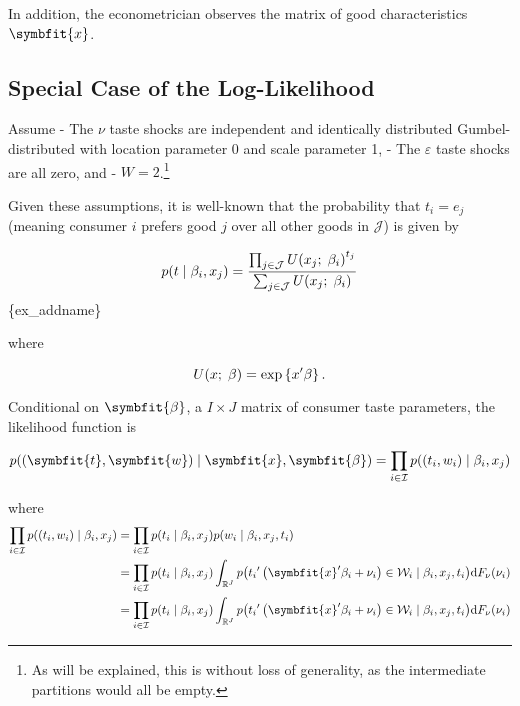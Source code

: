 \documentclass[
  letterpaper,
  DIV=11,
  numbers=noendperiod]{scrartcl}
\begin{document}
In addition, the econometrician observes the matrix of good
characteristics \(\symbfit{x}\).

\subsection{Special Case of the
Log-Likelihood}\label{special-case-of-the-log-likelihood}

Assume - The \(\nu\) taste shocks are independent and identically
distributed Gumbel-distributed with location parameter 0 and scale
parameter 1, - The \(\varepsilon\) taste shocks are all zero, and -
\(W=2\).\footnote{As will be explained, this is without loss of generality, as the intermediate partitions would all be empty.}

Given these assumptions, it is well-known that the probability that
\(t_i = e_j\) (meaning consumer \(i\) prefers good \(j\) over all other
goods in \(\mathcal{J}\)) is given by

\[
p\mleft(t \mid \beta_i,x_j\mright) = \frac{\prod_{j\in{}\mathcal{J}} U\mleft(x_j;\;\beta_i\mright)^{t_j}}{\sum_{j\in{}\mathcal{J}} U\mleft(x_j;\;\beta_i\mright) }
\] \{ex\_addname\}

where

\[
U\mleft(x;\;\beta\mright) = \exp\left\lbrace x'\beta\right\rbrace.
\]

Conditional on \(\symbfit{\beta}\), a \(I\times{}J\) matrix of consumer
taste parameters, the likelihood function is

\[
p\mleft(\left(\symbfit{t},\symbfit{w}\right)\mid \symbfit{x},\symbfit{\beta}\mright) = \prod_{i\in{}\mathcal{I}} p\mleft(\left(t_i,w_i\right) \mid \beta_i,x_j\mright)
\]

where \[
\begin{align}
    \prod_{i\in{}\mathcal{I}} p\mleft(\left(t_i,w_i\right) \mid \beta_i,x_j\mright) &= \prod_{i\in\mathcal{I}} p\mleft(t_i\mid\beta_i,x_j\mright) p\mleft(w_i\mid\beta_i,x_j,t_i\mright) \\
    &= \prod_{i\in\mathcal{I}} p\mleft(t_i\mid\beta_i,x_j\mright) \int_{\mathbb{R}^J} p\mleft({t_i}'\left(\symbfit{x}'\beta_i+\nu_i\right)\in \mathcal{W}_i \mid \beta_i,x_j,t_i\mright) \mathrm{d}F_\nu\mleft(\nu_{i}\mright) \\
    &= \prod_{i\in\mathcal{I}} p\mleft(t_i\mid\beta_i,x_j\mright) \int_{\mathbb{R}^J} p\mleft({t_i}'\left(\symbfit{x}'\beta_i+\nu_i\right)\in \mathcal{W}_i \mid \beta_i,x_j,t_i\mright) \mathrm{d}F_\nu\mleft(\nu_{i}\mright)
\end{align}
\]
\end{document}
